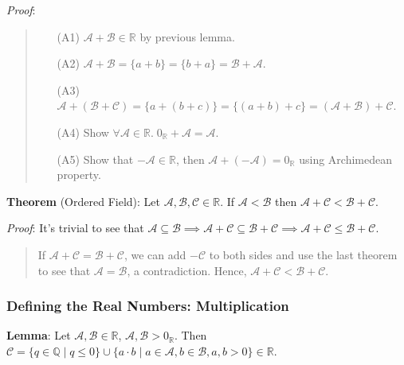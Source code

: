 \documentclass[11pt]{article}
\begin{document}
\emph{Proof}:
\begin{quote}\vspace{-0.3cm}
	\begin{enumerate}
	\item[(A1)] $\mathcal{A} + \mathcal{B} \in \mathbb{R}$ by previous lemma.
	\item[(A2)] $\mathcal{A} + \mathcal{B} = \{a + b\} = \{b + a\} = \mathcal{B} + \mathcal{A}$.
	\item[(A3)] $\mathcal{A} + (\mathcal{B} + \mathcal{C}) = \{a + (b+c)\} = \{(a+b) + c\} = (\mathcal{A} + \mathcal{B}) + \mathcal{C}$.
	\item[(A4)] Show $\forall \mathcal{A} \in \mathbb{R}.\; 0_\mathbb{R} + \mathcal{A} = \mathcal{A}$.
	\item[(A5)] Show that $-\mathcal{A} \in \mathbb{R}$, then $\mathcal{A} + (-\mathcal{A}) = 0_\mathbb{R}$ using Archimedean property.
	\end{enumerate}
\end{quote}
\textbf{Theorem} (Ordered Field): Let $\mathcal{A}, \mathcal{B}, \mathcal{C} \in \mathbb{R}$. If $\mathcal{A} < \mathcal{B}$ then $\mathcal{A} + \mathcal{C} < \mathcal{B} + \mathcal{C}$.

\emph{Proof}: It's trivial to see that $\mathcal{A} \subseteq \mathcal{B} \implies \mathcal{A} + \mathcal{C} \subseteq \mathcal{B} + \mathcal{C} \implies \mathcal{A} + \mathcal{C} \leq \mathcal{B} + \mathcal{C}$.
\begin{quote}\vspace{-0.3cm}
If $\mathcal{A} + \mathcal{C} = \mathcal{B} + \mathcal{C}$, we can add $- \mathcal{C}$ to both sides and use the last theorem to see that $\mathcal{A} = \mathcal{B}$, a contradiction. Hence, $\mathcal{A} + \mathcal{C} < \mathcal{B} + \mathcal{C}$.
\end{quote}

\subsubsection{Defining the Real Numbers: Multiplication}

\textbf{Lemma}: Let $\mathcal{A}, \mathcal{B} \in \mathbb{R}$, $\mathcal{A}, \mathcal{B} > 0_\mathbb{R}$. Then $\mathcal{C} = \{q \in \mathbb{Q} \;|\; q \leq 0\} \cup \{a \cdot b \;|\; a \in \mathcal{A}, b \in \mathcal{B}, a, b > 0\} \in \mathbb{R}$.
\end{document}
